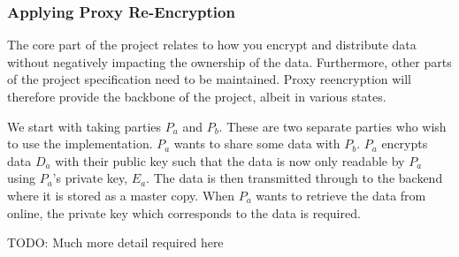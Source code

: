 
\subsubsection{Applying Proxy Re-Encryption}

The core part of the project relates to how you encrypt and distribute data without negatively impacting the ownership of the data. Furthermore, other parts of the project specification need to be maintained. Proxy reencryption will therefore provide the backbone of the project, albeit in various states.

We start with taking parties $P_a$ and $P_b$. These are two separate parties who wish to use the implementation. $P_a$ wants to share some data with $P_b$. $P_a$ encrypts data $D_a$ with their public key such that the data is now only readable by $P_a$ using $P_a$'s private key, $E_a$. The data is then transmitted through to the backend where it is stored as a master copy. When $P_a$ wants to retrieve the data from online, the private key which corresponds to the data is required.

TODO: Much more detail required here
